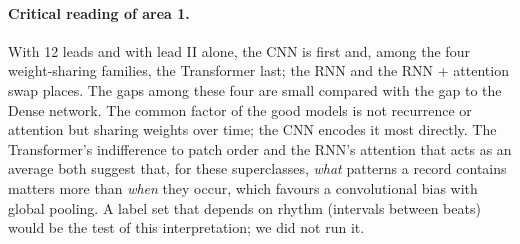 \paragraph{Critical reading of area 1.} With 12 leads and with lead II alone, the CNN is first and,
among the four weight-sharing families, the Transformer last; the RNN and the RNN + attention swap
places. The gaps among these four are small compared with the gap to the Dense network. The common factor of the good models is not
recurrence or attention but sharing weights over time; the CNN encodes it most directly. The Transformer's indifference to patch order and the RNN's attention that
acts as an average both suggest that, for these superclasses, \emph{what} patterns a record contains
matters more than \emph{when} they occur, which favours a convolutional bias with global pooling. A
label set that depends on rhythm (intervals between beats) would be the test of this interpretation;
we did not run it.
